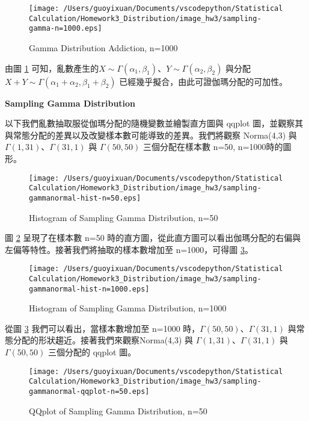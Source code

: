 \begin{figure}[H]
    \centering
        \texttt{[image: /Users/guoyixuan/Documents/vscodepython/Statistical Calculation/Homework3\_Distribution/image\_hw3/sampling-gamma-n=1000.eps]}
    \caption{Gamma Distribution Addiction, n=1000}
    \label{sampling-gamma-n=1000}
\end{figure}

由圖 \ref{sampling-gamma-n=1000} 可知，亂數產生的$X \sim \Gamma(\alpha_1,\beta_1)$、$Y \sim \Gamma(\alpha_2,\beta_2)$ 與分配 $X+Y \sim \Gamma(\alpha_1+\alpha_2,\beta_1+\beta_2)$ 已經幾乎擬合，由此可證伽瑪分配的可加性。

\textbf{Sampling Gamma Distribution}

以下我們亂數抽取服從伽瑪分配的隨機變數並繪製直方圖與 qqplot 圖，並觀察其與常態分配的差異以及改變樣本數可能導致的差異。我們將觀察 Norma(4,3) 與 $\Gamma(1,31)$、$\Gamma(31,1)$ 與 $\Gamma(50,50)$ 三個分配在樣本數 n=50, n=1000時的圖形。

\begin{figure}[H]
    \centering
        \texttt{[image: /Users/guoyixuan/Documents/vscodepython/Statistical Calculation/Homework3\_Distribution/image\_hw3/sampling-gammanormal-hist-n=50.eps]}
    \caption{Histogram of Sampling Gamma Distribution, n=50}
    \label{sampling-gammanormal-hist-n=50}
\end{figure}

圖 \ref{sampling-gammanormal-hist-n=50} 呈現了在樣本數 n=50 時的直方圖，從此直方圖可以看出伽瑪分配的右偏與左偏等特性。接著我們將抽取的樣本數增加至 n=1000，可得圖 \ref{sampling-gammanormal-hist-n=1000}。

\begin{figure}[H]
    \centering
        \texttt{[image: /Users/guoyixuan/Documents/vscodepython/Statistical Calculation/Homework3\_Distribution/image\_hw3/sampling-gammanormal-hist-n=1000.eps]}
    \caption{Histogram of Sampling Gamma Distribution, n=1000}
    \label{sampling-gammanormal-hist-n=1000}
\end{figure}

從圖 \ref{sampling-gammanormal-hist-n=1000} 我們可以看出，當樣本數增加至 n=1000 時，$\Gamma(50,50)$、$\Gamma(31,1)$ 與常態分配的形狀趨近。接著我們來觀察Norma(4,3) 與 $\Gamma(1,31)$、$\Gamma(31,1)$ 與 $\Gamma(50,50)$ 三個分配的 qqplot 圖。

\begin{figure}[H]
    \centering
        \texttt{[image: /Users/guoyixuan/Documents/vscodepython/Statistical Calculation/Homework3\_Distribution/image\_hw3/sampling-gammanormal-qqplot-n=50.eps]}
    \caption{QQplot of Sampling Gamma Distribution, n=50}
    \label{sampling-gammanormal-qqplot-n=50}
\end{figure}

